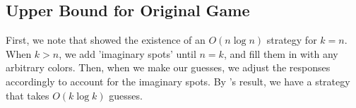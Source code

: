 \documentclass[12pt, a4paper]{article}
\begin{document}
\subsection{Upper Bound for Original Game}
First, we note that \cite{DS13} showed the existence of an $O(n \log n)$ strategy for
$k = n$. When $k>n$, we add 'imaginary spots' until $n = k$, and fill them in with any
arbitrary colors. Then, when we make our guesses, we adjust the responses accordingly
to account for the imaginary spots. By \cite{DS13}'s result, we have a strategy that
takes $O(k \log k)$ guesses.




\end{document}
